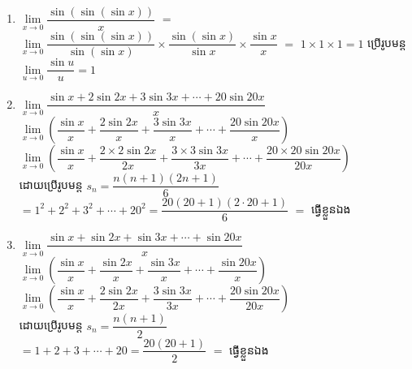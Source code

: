 \documentclass[a4paper, 12pt]{article}
\begin{document}
\begin{enumerate}
\begin{enumerate}
		\item $ \lim\limits_{x\to 0}\dfrac{\sin(\sin(\sin x))}{x}$ $=$
		$ \lim\limits_{x\to 0} \dfrac{\sin(\sin(\sin x))}{\sin(\sin x)}\times \dfrac{\sin(\sin x)}{\sin x}  \times \dfrac{\sin x}{x}$ $ = $ $ 1\times1\times1=1 $ ប្រើរូបមន្ត $ \lim\limits_{u\to 0} \dfrac{\sin u}{u} =1 $
		\item $ \lim\limits_{x\to 0} \dfrac{\sin x+2\sin2x+3\sin3x+\cdots+20\sin20x}{x} $\\
		$ \lim\limits_{x\to 0}\left( \dfrac{\sin x}{x}+\dfrac{2\sin2x}{x}+\dfrac{3\sin3x}{x}+\cdots+\dfrac{20\sin20x}{x}\right)  $ \\
		$ \lim\limits_{x\to 0}\left( \dfrac{\sin x}{x}+\dfrac{2\times2\sin2x}{2x}+\dfrac{3\times3\sin3x}{3x}+\cdots+\dfrac{20\times20\sin20x}{20x}\right)  $ \\
		ដោយប្រើរូបមន្ត $ s_{n}=\dfrac{n(n+1)(2n+1)}{6} $\\
		$=1^2+2^2+3^2+\cdots+20^2 =\dfrac{20(20+1)(2\cdot20+1)}{6}$ $= $ ធ្វើខ្លួនឯង
		\item $ \lim\limits_{x\to 0} \dfrac{\sin x+\sin2x+\sin3x+\cdots+\sin20x}{x} $\\
		$ \lim\limits_{x\to 0}\left( \dfrac{\sin x}{x}+\dfrac{\sin2x}{x}+\dfrac{\sin3x}{x}+\cdots+\dfrac{\sin20x}{x}\right)  $ \\
			$ \lim\limits_{x\to 0}\left( \dfrac{\sin x}{x}+\dfrac{2\sin2x}{2x}+\dfrac{3\sin3x}{3x}+\cdots+\dfrac{20\sin20x}{20x}\right)  $ \\
				ដោយប្រើរូបមន្ត $ s_{n}=\dfrac{n(n+1)}{2} $\\
				$=1+2+3+\cdots+20 =\dfrac{20(20+1)}{2}$ $= $ ធ្វើខ្លួនឯង
	\end{enumerate}
	\end{enumerate}
\end{document}
